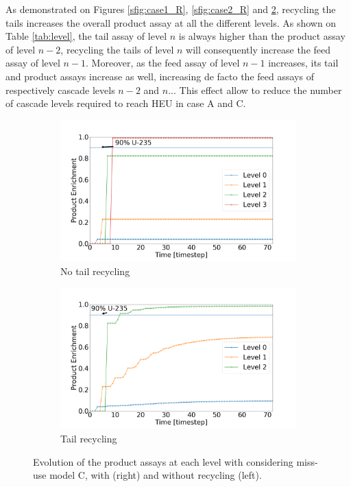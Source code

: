 As demonstrated on Figures \ref{sfig:case1_R}, \ref{sfig:case2_R} and
\ref{sfig:case3_R}, recycling the tails increases the overall product assay at
all the different levels. As shown on Table \ref{tab:level}, the tail assay of
level $n$ is always higher than the product assay of level $n-2$, recycling the
tails of level $n$ will consequently increase the feed assay of level $n-1$.
Moreover, as the feed assay of level $n-1$ increases, its tail and product
assays increase as well, increasing de facto the feed assays of respectively
cascade levels $n-2$ and $n$...  This effect allow to reduce the number of
cascade levels required to reach \gls{HEU} in case A and C.

\begin{figure}[h!]
    \centering
    \begin{subfigure}[t]{0.45\textwidth}
        \centering
        \includegraphics[scale=0.17]{NR_case3}
        \caption{No tail recycling}
        \label{sfig:case3_NR}
    \end{subfigure}%
    \begin{subfigure}[t]{0.45\textwidth}
        \centering
        \includegraphics[scale=0.17]{R_case3}
        \caption{Tail recycling}
        \label{sfig:case3_R}
    \end{subfigure}
    \caption{Evolution of the product assays at each level with considering
    miss-use model C, with (right) and without recycling (left).}
    \label{fig:case3}
\end{figure}



